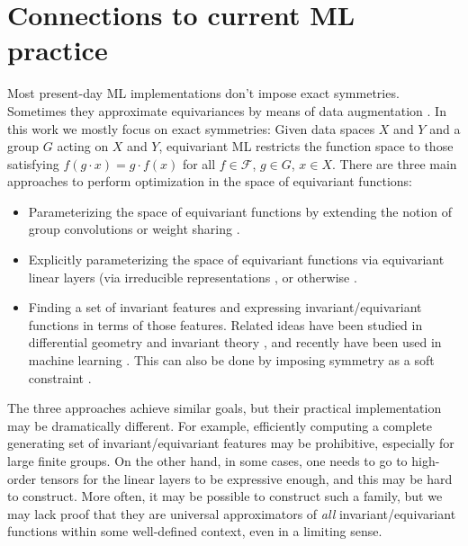 \documentclass[accepted]{article}
\renewcommand{\mathcal}[1]{\mathscr{#1}} %
\begin{document}
\section{Connections to current ML practice}\label{sec:practice}
Most present-day ML implementations don't impose exact symmetries. Sometimes they approximate equivariances by means of data augmentation \citep{chen2020group, huang2022quantifying}.
In this work we mostly focus on exact symmetries: Given data spaces $X$ and $Y$ and a group $G$ acting on $X$ and $Y$, equivariant ML restricts the function space to those satisfying  $f(g\cdot x) = g \cdot f(x)$ for all $f\in \mathcal F$, $g\in G$, $x\in X$.
There are three main approaches to perform optimization in the space of equivariant functions:
\begin{itemize}
    \item Parameterizing the space of equivariant functions by extending the notion of group convolutions or weight sharing \citep{kondor2018convolution, cohen2016group, weiler2021coordinate}.
    \item Explicitly parameterizing the space of equivariant functions via equivariant linear layers (via irreducible representations \citep{thomas2018tensor, geiger2022e3nn, kondor2018n}, or otherwise \citep{maron2018invariant, finzi2020generalizing, finzi2021practical}.
    \item Finding a set of invariant features and expressing invariant/equivariant functions in terms of those features. Related ideas have been studied in differential geometry and invariant theory \citep{fels1998moving}, and recently have been used in machine learning \citep{villar2021scalars,blum2022equivariant, cahill2022group, dym2022low, pmlr-v202-kaba23a}. This can also be done by imposing symmetry as a soft constraint \citep{NEURIPS2022_dcd29769, gupta2023structuring}.
\end{itemize}
The three approaches achieve similar goals, but their practical implementation may be dramatically different. For example, efficiently computing a complete generating set of invariant/equivariant features may be prohibitive, especially for large finite groups. On the other hand, in some cases, one needs to go to high-order tensors for the linear layers to be expressive enough, and this may be hard to construct. More often, it may be possible to construct such a family, but we may lack proof that they are universal approximators of \textit{all} invariant/equivariant functions within some well-defined context, even in a limiting sense.
\end{document}

